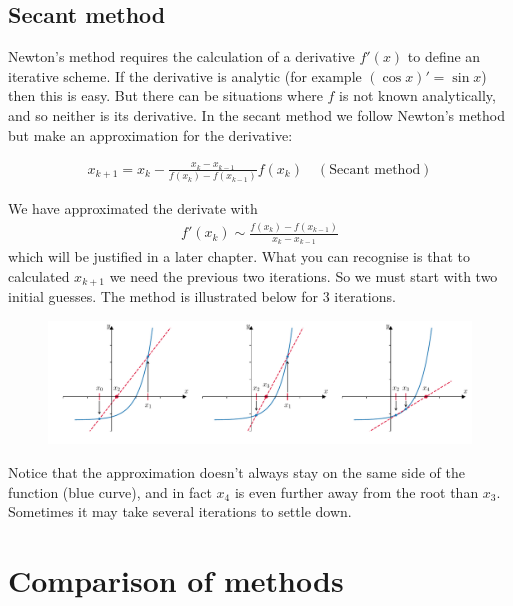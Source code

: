\subsection{Secant method}

Newton's method requires the calculation of a derivative $f'(x)$ to define an iterative scheme. If the derivative is analytic (for example $(\cos x)' = \sin x$) then this is easy. But there can be situations where $f$ is not known analytically, and so neither is its derivative. In the secant method we follow Newton's method but make an approximation for the derivative:

\begin{align*}
\boxed{x_{k+1} = x_{k} - \frac{x_k - x_{k-1}}{f(x_{k}) - f(x_{k-1})}  f(x_{k}) \quad (\text{Secant method})}
\end{align*}

We have approximated the derivate with
\begin{align*}
f'(x_k) \sim \frac{f(x_{k}) - f(x_{k-1})}{x_k - x_{k-1}}
\end{align*}
which will be justified in a later chapter. What you can recognise is that to calculated $x_{k+1}$ we need the previous two iterations. So we must start with two initial guesses. The method is illustrated below for 3 iterations.
\begin{figure}[H]
\begin{center}
\includegraphics[width=\linewidth]{figures/ch2_secant1.pdf}  \label{fig:ch2_secant1}
\end{center}
\end{figure}

\noindent Notice that the approximation doesn't always stay on the same side of the function (blue curve), and in fact $x_4$ is even further away from the root than $x_3$. Sometimes it may take several iterations to settle down.


\section{Comparison of methods}

